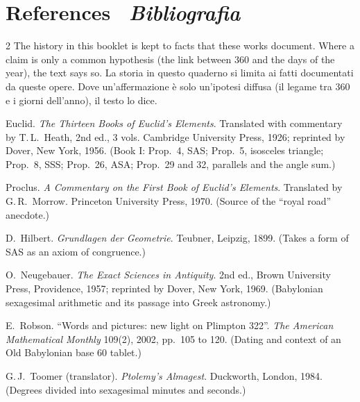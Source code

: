 \documentclass[10pt,a4paper,oneside]{book}
\newif\ifIT
\newenvironment{bi}%
  {\begin{paracol}{2}\global\ITfalse\selectlanguage{english}}%
  {\end{paracol}}
\newcommand{\IT}{\switchcolumn\global\ITtrue\selectlanguage{italian}}
\begin{document}
\section*{References \textperiodcentered\ {\color{itgreen}\itshape Bibliografia}}
\begin{bi}
The history in this booklet is kept to facts that these works document. Where a claim is only a common hypothesis (the link between 360 and the days of the year), the text says so.
\IT
La storia in questo quaderno si limita ai fatti documentati da queste opere. Dove un'affermazione è solo un'ipotesi diffusa (il legame tra 360 e i giorni dell'anno), il testo lo dice.
\end{bi}
{\small
\begin{enumerate}[label={[\arabic*]}, leftmargin=2.2em, itemsep=2pt]
\item Euclid. \emph{The Thirteen Books of Euclid's Elements}. Translated with commentary by T.\,L.~Heath, 2nd ed., 3 vols. Cambridge University Press, 1926; reprinted by Dover, New York, 1956. (Book I: Prop.~4, SAS; Prop.~5, isosceles triangle; Prop.~8, SSS; Prop.~26, ASA; Prop.~29 and 32, parallels and the angle sum.)
\item Proclus. \emph{A Commentary on the First Book of Euclid's Elements}. Translated by G.\,R.~Morrow. Princeton University Press, 1970. (Source of the ``royal road'' anecdote.)
\item D.~Hilbert. \emph{Grundlagen der Geometrie}. Teubner, Leipzig, 1899. (Takes a form of SAS as an axiom of congruence.)
\item O.~Neugebauer. \emph{The Exact Sciences in Antiquity}. 2nd ed., Brown University Press, Providence, 1957; reprinted by Dover, New York, 1969. (Babylonian sexagesimal arithmetic and its passage into Greek astronomy.)
\item E.~Robson. ``Words and pictures: new light on Plimpton 322''. \emph{The American Mathematical Monthly} 109(2), 2002, pp.~105 to 120. (Dating and context of an Old Babylonian base 60 tablet.)
\item G.\,J.~Toomer (translator). \emph{Ptolemy's Almagest}. Duckworth, London, 1984. (Degrees divided into sexagesimal minutes and seconds.)
\end{enumerate}
}

\end{document}
